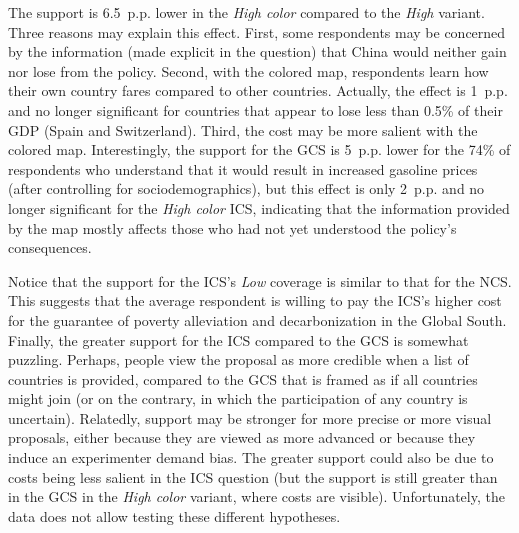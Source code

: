 \documentclass[12pt,english]{article}
\begin{document}
\begin{bibunit}
The support is 6.5~p.p. lower in the \textit{High color} compared to the \textit{High} variant. Three reasons may explain this effect. First, some respondents may be concerned by the information (made explicit in the question) that China would neither gain nor lose from the policy. 
Second, with the colored map, respondents learn how their own country fares compared to other countries. Actually, the effect is 1~p.p. and no longer significant for countries that appear to lose less than 0.5\% of their GDP (Spain and Switzerland). Third, the cost may be more salient with the colored map. Interestingly, the support for the GCS is 5~p.p. lower for the 74\% of respondents who understand that it would result in increased gasoline prices (after controlling for sociodemographics), but this effect is only 2~p.p. and no longer significant for the \textit{High color} ICS, indicating that the information provided by the map mostly affects those who had not yet understood the policy's consequences. 

Notice that the support for the ICS's \textit{Low} coverage is similar to that for the NCS. This suggests that the average respondent is willing to pay the ICS's higher cost for the guarantee of poverty alleviation and decarbonization in the Global South. %
Finally, the greater support for the ICS compared to the GCS is somewhat puzzling. Perhaps, people view the proposal as more credible when a list of countries is provided, compared to the GCS that is framed as if all countries might join (or on the contrary, in which the participation of any country is uncertain). Relatedly, support may be stronger for more precise or more visual proposals, either because they are viewed as more advanced or because they induce an experimenter demand bias. The greater support could also be due to costs being less salient in the ICS question (but the support is still greater than in the GCS in the \textit{High color} variant, where costs are visible). Unfortunately, the data does not allow testing these different hypotheses.



\end{bibunit}
\end{document}
